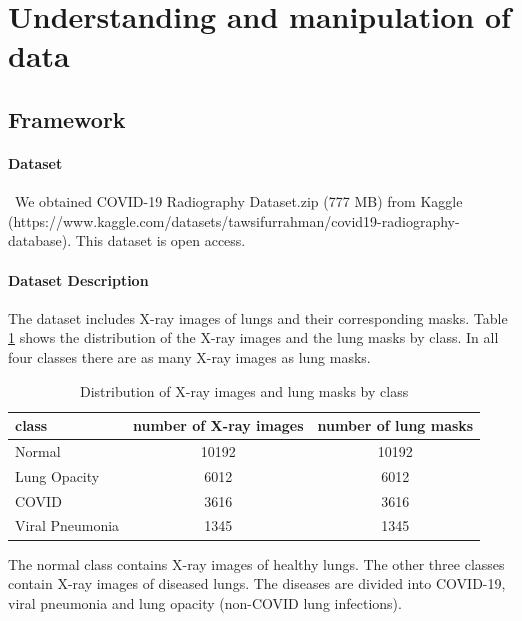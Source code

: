 \documentclass{article}
\begin{document}
\newpage 

\section{Understanding and manipulation of data}

\subsection{Framework}

\paragraph{Dataset}\
We obtained COVID-19 Radiography Dataset.zip (777 MB) from Kaggle (https://www.kaggle.com/datasets/tawsifurrahman/covid19-radiography-database). This dataset is open access.



\paragraph{Dataset Description}
The dataset includes X-ray images of lungs and their corresponding masks. Table \ref{tab:xray_lung_masks} shows the distribution of the X-ray images and the lung masks by class. In all four classes there are as many X-ray images as lung masks.

\begin{table}[h]
    \centering
    \begin{tabular}{|l|c|c|}
        \hline
        \toprule
        \textbf{class} & \textbf{number of X-ray images} & \textbf{number of lung masks} \\
        \hline
        \midrule
        Normal & 10192 & 10192 \\
        \hline
        Lung Opacity & 6012 & 6012 \\
        \hline
        COVID & 3616 & 3616 \\
        \hline
        Viral Pneumonia & 1345 & 1345 \\
        \hline
        \bottomrule
    \end{tabular}
    \caption{Distribution of X-ray images and lung masks by class}
    \label{tab:xray_lung_masks}
\end{table}

The normal class contains X-ray images of healthy lungs. The other three classes contain X-ray images of diseased lungs. The diseases are divided into COVID-19, viral pneumonia and lung opacity (non-COVID lung infections). 
\end{document}
